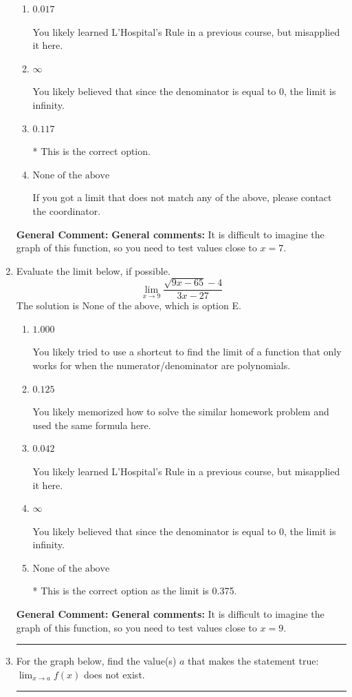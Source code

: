 \documentclass{extbook}[14pt]
\newcommand{\litem}[1]{\item #1

\rule{\textwidth}{0.4pt}}
\begin{document}
\begin{enumerate}
{\begin{enumerate}[label=\Alph*.]
You likely memorized how to solve the similar homework problem and used the same formula here.
\item \( 0.017 \)

You likely learned L'Hospital's Rule in a previous course, but misapplied it here.
\item \( \infty \)

You likely believed that since the denominator is equal to 0, the limit is infinity.
\item \( 0.117 \)

* This is the correct option.
\item \( \text{None of the above} \)

If you got a limit that does not match any of the above, please contact the coordinator.
\end{enumerate}

\textbf{General Comment:} \textbf{General comments:} It is difficult to imagine the graph of this function, so you need to test values close to $x = 7$.
}
\litem{
Evaluate the limit below, if possible.
\[ \lim_{x \rightarrow 9} \frac{\sqrt{9x - 65} - 4}{3x - 27} \]The solution is \( \text{None of the above} \), which is option E.\begin{enumerate}[label=\Alph*.]
\item \( 1.000 \)

You likely tried to use a shortcut to find the limit of a function that only works for when the numerator/denominator are polynomials.
\item \( 0.125 \)

You likely memorized how to solve the similar homework problem and used the same formula here.
\item \( 0.042 \)

You likely learned L'Hospital's Rule in a previous course, but misapplied it here.
\item \( \infty \)

You likely believed that since the denominator is equal to 0, the limit is infinity.
\item \( \text{None of the above} \)

* This is the correct option as the limit is 0.375.
\end{enumerate}

\textbf{General Comment:} \textbf{General comments:} It is difficult to imagine the graph of this function, so you need to test values close to $x = 9$.
}
\litem{
For the graph below, find the value(s) $a$ that makes the statement true: $ \displaystyle \lim_{x \rightarrow a} f(x)$ does not exist.

}
\end{enumerate}
\end{document}
